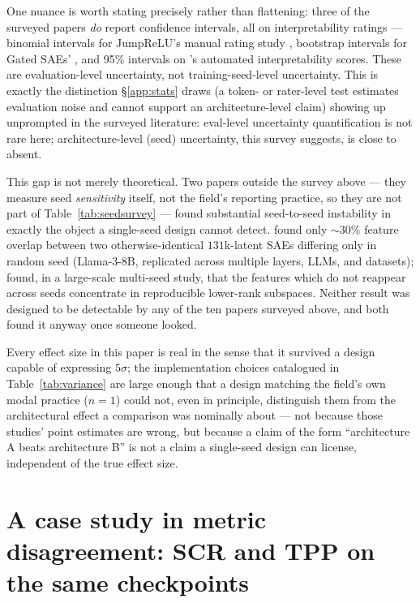 \documentclass[11pt]{article}
\begin{document}
One nuance is worth stating precisely rather than flattening: three of the
surveyed papers \emph{do} report confidence intervals, all on interpretability
ratings --- binomial intervals for JumpReLU's manual rating study
\citep{rajamanoharan2024jumprelu}, bootstrap intervals for Gated SAEs'
\citep{rajamanoharan2024gated}, and 95\% intervals on
\citet{cunningham2023sparse}'s automated interpretability scores. These are
evaluation-level uncertainty, not training-seed-level uncertainty. This is
exactly the distinction \S\ref{app:stats} draws (a token- or rater-level
test estimates evaluation noise and cannot support an architecture-level
claim) showing up unprompted in the surveyed literature: eval-level
uncertainty quantification is not rare here; architecture-level (seed)
uncertainty, this survey suggests, is close to absent.

This gap is not merely theoretical. Two papers outside the survey above ---
they measure seed \emph{sensitivity} itself, not the field's reporting
practice, so they are not part of Table~\ref{tab:seedsurvey} --- found
substantial seed-to-seed instability in exactly the object a single-seed
design cannot detect. \citet{paulo2025sae} found only $\sim30\%$ feature
overlap between two otherwise-identical $131$k-latent SAEs differing only
in random seed (Llama-3-8B, replicated across multiple layers, LLMs, and
datasets); \citet{gerasimov2026unstable} found, in a large-scale multi-seed
study, that the features which do not reappear across seeds concentrate in
reproducible lower-rank subspaces. Neither result was designed
to be detectable by any of the ten papers surveyed above, and both found
it anyway once someone looked.

Every effect size in this paper is real in the sense that it survived a
design capable of expressing $5\sigma$; the implementation choices
catalogued in Table~\ref{tab:variance} are large enough that a design
matching the field's own modal practice ($n=1$) could not, even in
principle, distinguish them from the architectural effect a comparison was
nominally about --- not because those studies' point estimates are wrong,
but because a claim of the form ``architecture A beats architecture B''
is not a claim a single-seed design can license, independent of the true
effect size.

\section{A case study in metric disagreement: SCR and TPP on the same checkpoints}
\label{sec:e4}
\end{document}

